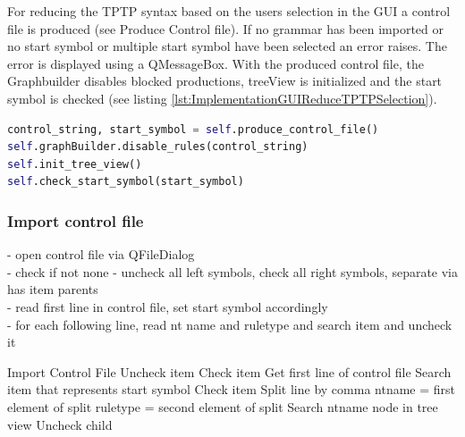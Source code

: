 For reducing the \ac{TPTP} syntax based on the users selection in the GUI a control file is produced (see Produce Control file). If no grammar has been imported or no start symbol or multiple start symbol have been selected an error raises. The error is displayed using a QMessageBox. With the produced control file, the Graphbuilder disables blocked productions, treeView is initialized  and the start symbol is checked (see listing \ref{lst:ImplementationGUIReduceTPTPSelection}). 

\begin{lstlisting}[language=Python, basicstyle=\scriptsize	,caption= Reduce TPTP syntax with selection,label= lst:ImplementationGUIReduceTPTPSelection]
control_string, start_symbol = self.produce_control_file()
self.graphBuilder.disable_rules(control_string)
self.init_tree_view()
self.check_start_symbol(start_symbol)
\end{lstlisting}

\subsubsection{Import control file}\label{sec:ImplementationGUIImportControlFile}
- open control file via QFileDialog \\
- check if not none
- uncheck all left symbols, check all right symbols, separate via has item parents \\
- read first line in control file, set start symbol accordingly  \\
- for each following line, read nt name and ruletype and search item and uncheck it

\begin{algorithm}[H]
\caption{GUI Algorithm: load\textunderscore controlfile}
\label{alg:importControlfile}
\begin{algorithmic}[1] 
\State Import Control File
			\State Uncheck item
		\EndIf
	\Else
		\State Check item 
	\EndIf
\EndFor
\State Get first line of control file
\State Search item that represents start symbol 
\State Check item
	\State Split line by comma
	\State nt\textunderscore name = first element of split
	\State rule\textunderscore type = second element of split
	\State Search nt\textunderscore name node in tree view
				\State Uncheck child
			\EndIf
		\EndFor
	\EndIf 
\EndFor
\EndIf
\end{algorithmic}
\end{algorithm} 

